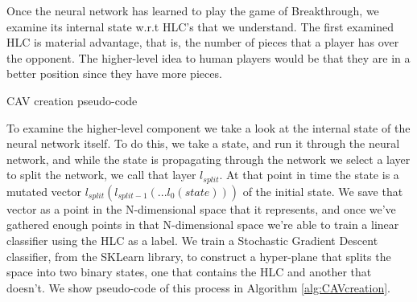 Once the neural network has learned to play the game of Breakthrough, we examine its internal state w.r.t HLC's that we understand. The first examined HLC is material advantage, that is, the number of pieces that a player has over the opponent. The higher-level idea to human players would be that they are in a better position since they have more pieces.

\begin{algorithm}[t]
    \caption{CAV creation pseudo-code}
    \label{alg:CAVcreation}
    \begin{algorithmic}[1]
        \ENDFOR
    \end{algorithmic}
\end{algorithm}

To examine the higher-level component we take a look at the internal state of the neural network itself. To do this, we take a state, and run it through the neural network, and while the state is propagating through the network we select a layer to split the network, we call that layer $l_{split}$. At that point in time the state is a mutated vector $l_{split}(l_{split-1}(...l_0(state)))$ of the initial state. We save that vector as a point in the N-dimensional space that it represents, and once we've gathered enough points in that N-dimensional space we're able to train a linear classifier using the HLC as a label. We train a Stochastic Gradient Descent classifier, from the SKLearn library, to construct a hyper-plane that splits the space into two binary states, one that contains the HLC and another that doesn't. We show pseudo-code of this process in Algorithm \ref{alg:CAVcreation}.

